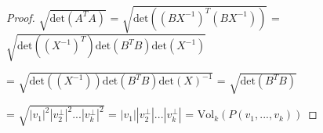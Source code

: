 \begin{proof}
        \hspace{0.5cm}
        $\sqrt{\text{det}(A^TA)}$
        = $\sqrt{\text{det}((BX^{-1})^T(BX^{-1}))}$
        = $\sqrt{\text{det}((X^{-1})^T) \text{det}(B^TB) \text{det}(X^{-1})}$

        \hspace{2.8cm}
        = $\sqrt{\text{det}((X^{-1})) \text{det}(B^TB) \text{det}(X)^{-1}}$
        = $\sqrt{\text{det}(B^TB)}$
        
        \hspace{2.8cm}
        = $\sqrt{|v_1|^2 |v_2^{\perp}|^2 ... |v_k^{\perp}|^2}$
        = $|v_1| |v_2^{\perp}| ... |v_k^{\perp}|$
        = $\text{Vol}_k(P(v_1,...,v_k))$
    \end{proof}




